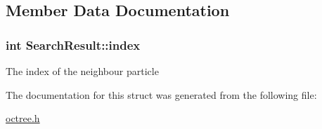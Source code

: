 \subsection{Member Data Documentation}
\hypertarget{structSearchResult_aa594b4339fa03e91d61d84c78e400b06}{
\subsubsection[{index}]{\setlength{\rightskip}{0pt plus 5cm}int Search\-Result\-::index}}\label{structSearchResult_aa594b4339fa03e91d61d84c78e400b06}
The index of the neighbour particle 

The documentation for this struct was generated from the following file\-:\begin{DoxyCompactItemize}
\item 
\hyperlink{octree_8h}{octree.\-h}\end{DoxyCompactItemize}
